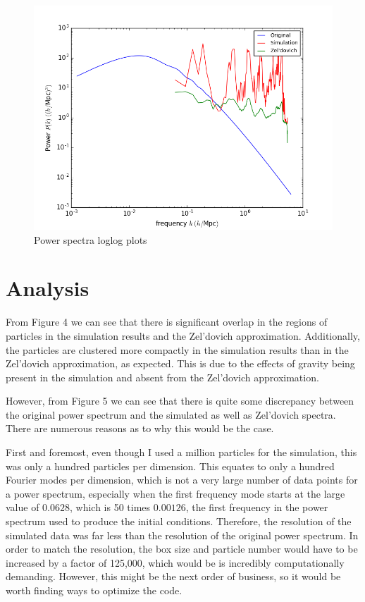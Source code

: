 \documentclass[12pt]{article}   	%
\begin{document}
\begin{figure}[h!]
\centering
\includegraphics[scale=0.85]{PSComparisonloglog.png}
\caption{Power spectra loglog plots}
\end{figure}

\clearpage

\section*{Analysis}
From Figure 4 we can see that there is significant overlap in the regions of particles in the
simulation results and the Zel'dovich approximation. Additionally, the particles are clustered
more compactly in the simulation results than in the Zel'dovich approximation, as expected. This is due 
to the effects of gravity being present in the simulation and absent from the Zel'dovich approximation.

However, from Figure 5 we can see that there is quite some discrepancy between the original power 
spectrum and the simulated as well as Zel'dovich spectra. There are numerous reasons as to why
this would be the case.

First and foremost, even though I used a million particles for the simulation, this was only a hundred
particles per dimension. This equates to only a hundred Fourier modes per dimension, which is not
a very large number of data points for a power spectrum, especially when the first frequency mode 
starts at the large value of $0.0628$, which is 50 times $0.00126$, the first frequency in the 
power spectrum used to produce the initial conditions. Therefore, the resolution of the simulated data
was far less than the resolution of the original power spectrum. In order to match the resolution,
the box size and particle number would have to be increased by a factor of 125,000, which would be
is incredibly computationally demanding. However, this might be the next order of business, so it would
be worth finding ways to optimize the code.
\end{document}
